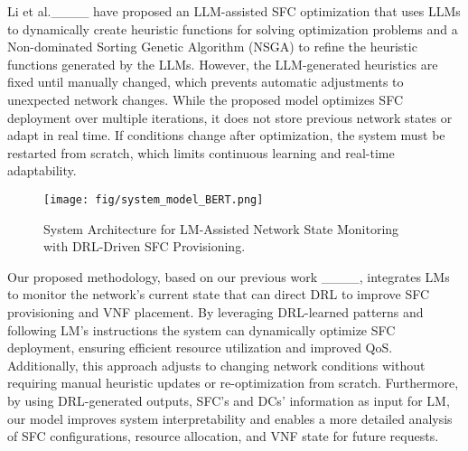 Li et al.____ have proposed an LLM-assisted  SFC optimization that uses LLMs to dynamically create heuristic functions for solving optimization problems and a Non-dominated Sorting Genetic Algorithm (NSGA) to refine the heuristic functions generated by the LLMs. However, the LLM-generated heuristics are fixed until manually changed, which prevents automatic adjustments to unexpected network changes. While the proposed model optimizes SFC deployment over multiple iterations, it does not  store previous network states or adapt in real time. If conditions change after optimization, the system must be restarted from scratch, which limits continuous learning and real-time adaptability.
 \begin{figure*}[!t]
        \centering
        \texttt{[image: fig/system\_model\_BERT.png]}
        \caption{System Architecture for LM-Assisted Network State Monitoring with DRL-Driven SFC Provisioning.}
        \label{fig:system} 
\end{figure*}
Our proposed methodology, based on our previous work ____, integrates  LMs to monitor the network's current state that can direct DRL to improve SFC provisioning and VNF placement. By leveraging DRL-learned patterns and following LM's instructions the system can dynamically optimize SFC deployment, ensuring efficient resource utilization and improved QoS. Additionally, this approach adjusts to changing network conditions without requiring manual heuristic updates or re-optimization from scratch. Furthermore, by using DRL-generated outputs, SFC's and DCs'  information as input for LM, our model improves system interpretability and enables a more detailed analysis of SFC configurations, resource allocation, and VNF state for future requests.